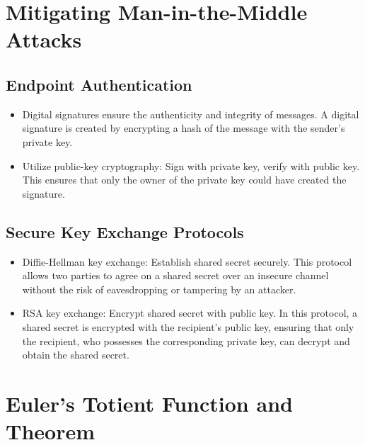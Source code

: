 \documentclass[11pt]{article}
\begin{document}
\section{Mitigating Man-in-the-Middle Attacks}
\subsection{Endpoint Authentication}
\begin{itemize}
    \item Digital signatures ensure the authenticity and integrity of messages. A digital signature is created by encrypting a hash of the message with the sender's private key.
    \item Utilize public-key cryptography: Sign with private key, verify with public key. This ensures that only the owner of the private key could have created the signature.
\end{itemize}

\subsection{Secure Key Exchange Protocols}
\begin{itemize}
    \item Diffie-Hellman key exchange: Establish shared secret securely. This protocol allows two parties to agree on a shared secret over an insecure channel without the risk of eavesdropping or tampering by an attacker.
    \item RSA key exchange: Encrypt shared secret with public key. In this protocol, a shared secret is encrypted with the recipient's public key, ensuring that only the recipient, who possesses the corresponding private key, can decrypt and obtain the shared secret.
\end{itemize}

\section{Euler’s Totient Function and Theorem}
\end{document}
